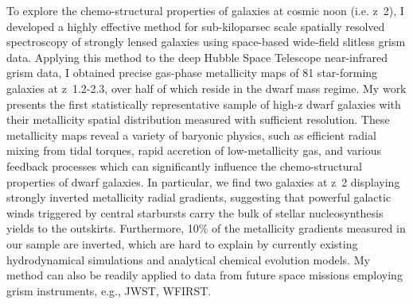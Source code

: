 
To explore the chemo-structural properties of galaxies at cosmic noon (i.e. z~2), I developed a highly effective
method for sub-kiloparsec scale spatially resolved spectroscopy of strongly lensed galaxies using space-based
wide-field slitless grism data. Applying this method to the deep Hubble Space Telescope near-infrared grism data,
I obtained precise gas-phase metallicity maps of 81 star-forming galaxies at z~1.2-2.3, over half of which reside
in the dwarf mass regime. My work presents the first statistically representative sample of high-z dwarf galaxies
with their metallicity spatial distribution measured with sufficient resolution. These metallicity maps reveal a
variety of baryonic physics, such as efficient radial mixing from tidal torques, rapid accretion of
low-metallicity gas, and various feedback processes which can significantly influence the chemo-structural
properties of dwarf galaxies. In particular, we find two galaxies at z~2 displaying strongly inverted metallicity
radial gradients, suggesting that powerful galactic winds triggered by central starbursts carry the bulk of
stellar nucleosynthesis yields to the outskirts. Furthermore, 10\% of the metallicity gradients measured in our
sample are inverted, which are hard to explain by currently existing hydrodynamical simulations and analytical
chemical evolution models. My method can also be readily applied to data from future space missions employing
grism instruments, e.g., JWST, WFIRST.

